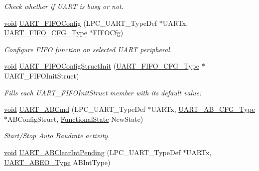 \begin{DoxyCompactItemize}
\begin{DoxyCompactList}\small\item\em Check whether if U\+A\+RT is busy or not. \end{DoxyCompactList}\item 
\hyperlink{usb__devapi_8h_afabf60e7f57651d6d595a02c75f07cd0}{void} \hyperlink{group___u_a_r_t___public___functions_ga91f3bb9558513f4a1da4163997bd198b}{U\+A\+R\+T\+\_\+\+F\+I\+F\+O\+Config} (L\+P\+C\+\_\+\+U\+A\+R\+T\+\_\+\+Type\+Def $\ast$U\+A\+R\+Tx, \hyperlink{struct_u_a_r_t___f_i_f_o___c_f_g___type}{U\+A\+R\+T\+\_\+\+F\+I\+F\+O\+\_\+\+C\+F\+G\+\_\+\+Type} $\ast$F\+I\+F\+O\+Cfg)
\begin{DoxyCompactList}\small\item\em Configure F\+I\+FO function on selected U\+A\+RT peripheral. \end{DoxyCompactList}\item 
\hyperlink{usb__devapi_8h_afabf60e7f57651d6d595a02c75f07cd0}{void} \hyperlink{group___u_a_r_t___public___functions_ga84c4e278cf63acef81e359b76d28319a}{U\+A\+R\+T\+\_\+\+F\+I\+F\+O\+Config\+Struct\+Init} (\hyperlink{struct_u_a_r_t___f_i_f_o___c_f_g___type}{U\+A\+R\+T\+\_\+\+F\+I\+F\+O\+\_\+\+C\+F\+G\+\_\+\+Type} $\ast$U\+A\+R\+T\+\_\+\+F\+I\+F\+O\+Init\+Struct)
\begin{DoxyCompactList}\small\item\em Fills each U\+A\+R\+T\+\_\+\+F\+I\+F\+O\+Init\+Struct member with its default value\+: \end{DoxyCompactList}\item 
\hyperlink{usb__devapi_8h_afabf60e7f57651d6d595a02c75f07cd0}{void} \hyperlink{group___u_a_r_t___public___functions_ga51b07c8e7c54845841a97ec9a8d67c3b}{U\+A\+R\+T\+\_\+\+A\+B\+Cmd} (L\+P\+C\+\_\+\+U\+A\+R\+T\+\_\+\+Type\+Def $\ast$U\+A\+R\+Tx, \hyperlink{struct_u_a_r_t___a_b___c_f_g___type}{U\+A\+R\+T\+\_\+\+A\+B\+\_\+\+C\+F\+G\+\_\+\+Type} $\ast$A\+B\+Config\+Struct, \hyperlink{agilefox_2library_2inc_2stm32f10x__type_8h_ac9a7e9a35d2513ec15c3b537aaa4fba1}{Functional\+State} New\+State)
\begin{DoxyCompactList}\small\item\em Start/\+Stop Auto Baudrate activity. \end{DoxyCompactList}\item 
\hyperlink{usb__devapi_8h_afabf60e7f57651d6d595a02c75f07cd0}{void} \hyperlink{group___u_a_r_t___public___functions_ga0c01f920210878891c8c10cb9620d5d6}{U\+A\+R\+T\+\_\+\+A\+B\+Clear\+Int\+Pending} (L\+P\+C\+\_\+\+U\+A\+R\+T\+\_\+\+Type\+Def $\ast$U\+A\+R\+Tx, \hyperlink{group___u_a_r_t___public___types_ga85f8df03cce76ca8e9404364a3b68487}{U\+A\+R\+T\+\_\+\+A\+B\+E\+O\+\_\+\+Type} A\+B\+Int\+Type)

\end{DoxyCompactItemize}
